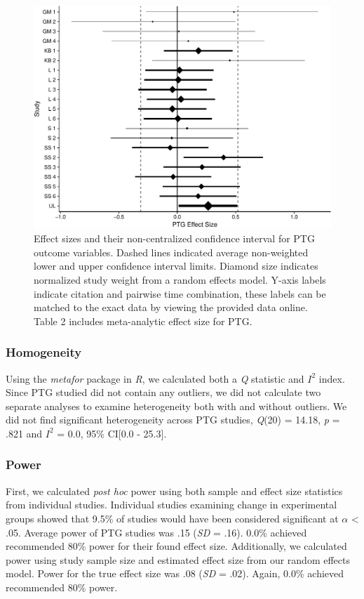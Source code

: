 \documentclass[man, mask]{apa6}
\theoremstyle{definition}
\theoremstyle{definition}
\theoremstyle{definition}
\theoremstyle{remark}
\begin{document}
\begin{figure}[htbp]
\centering
\includegraphics{meta_markdown_files/figure-latex/ptgpic-1.pdf}
\caption{\label{fig:ptgpic}Effect sizes and their non-centralized confidence
interval for PTG outcome variables. Dashed lines indicated average
non-weighted lower and upper confidence interval limits. Diamond size
indicates normalized study weight from a random effects model. Y-axis
labels indicate citation and pairwise time combination, these labels can
be matched to the exact data by viewing the provided data online. Table
2 includes meta-analytic effect size for PTG.}
\end{figure}

\subsubsection{Homogeneity}\label{homogeneity-1}

Using the \emph{metafor} package in \emph{R}, we calculated both a
\emph{Q} statistic and \(I^2\) index. Since PTG studied did not contain
any outliers, we did not calculate two separate analyses to examine
heterogeneity both with and without outliers. We did not find
significant heterogeneity across PTG studies, \emph{Q}(20) = 14.18,
\emph{p} = .821 and \(I^2\) = 0.0, 95\% CI{[}0.0 - 25.3{]}.

\subsubsection{Power}\label{power-1}

First, we calculated \emph{post hoc} power using both sample and effect
size statistics from individual studies. Individual studies examining
change in experimental groups showed that 9.5\% of studies would have
been considered significant at \(\alpha\) \textless{} .05. Average power
of PTG studies was .15 (\emph{SD} = .16). 0.0\% achieved recommended
80\% power for their found effect size. Additionally, we calculated
power using study sample size and estimated effect size from our random
effects model. Power for the true effect size was .08 (\emph{SD} = .02).
Again, 0.0\% achieved recommended 80\% power.
\end{document}
